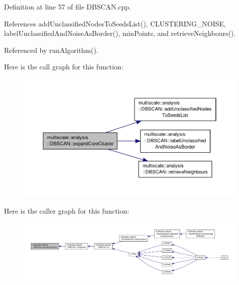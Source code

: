 Definition at line 57 of file D\-B\-S\-C\-A\-N.\-cpp.



References add\-Unclassified\-Nodes\-To\-Seeds\-List(), C\-L\-U\-S\-T\-E\-R\-I\-N\-G\-\_\-\-N\-O\-I\-S\-E, label\-Unclassified\-And\-Noise\-As\-Border(), min\-Points, and retrieve\-Neighbours().



Referenced by run\-Algorithm().



Here is the call graph for this function\-:\nopagebreak
\begin{figure}[H]
\begin{center}
\leavevmode
\includegraphics[width=350pt]{classmultiscale_1_1analysis_1_1DBSCAN_a400c4e9fb1d9e9bafa970b33912a5ce1_cgraph}
\end{center}
\end{figure}




Here is the caller graph for this function\-:\nopagebreak
\begin{figure}[H]
\begin{center}
\leavevmode
\includegraphics[width=350pt]{classmultiscale_1_1analysis_1_1DBSCAN_a400c4e9fb1d9e9bafa970b33912a5ce1_icgraph}
\end{center}
\end{figure}


